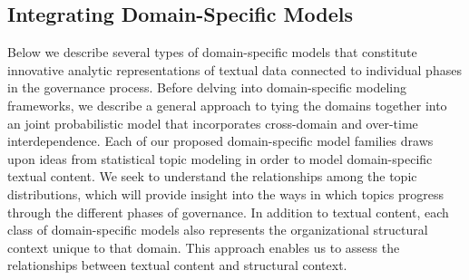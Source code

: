 \subsection{Integrating Domain-Specific Models}




Below we describe several types of domain-specific models that
constitute innovative analytic representations of textual data
connected to individual phases in the governance process. Before
delving into domain-specific modeling frameworks, we describe a
general approach to tying the domains together into an joint
probabilistic model that incorporates cross-domain and over-time
interdependence. Each of our proposed domain-specific model families
draws upon ideas from statistical topic modeling in order to model
domain-specific textual content. We seek to understand the
relationships among the topic distributions,
which will provide insight into the ways in which topics progress
through the different phases of governance.  In addition to textual
content, each class of domain-specific models also represents the
organizational structural context unique to that domain. This approach
enables us to assess the relationships between textual content and
structural context.



